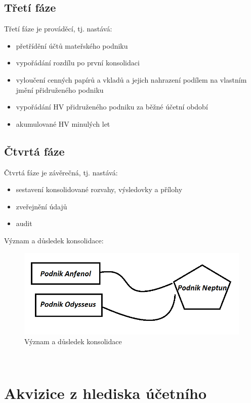 \documentclass[12pt]{article}
\begin{document}
\subsection{Třetí fáze}
Třetí fáze je prováděcí, tj. nastává:

\begin{itemize}
\item přetřídění účtů mateřského podniku
\item vypořádání rozdílu po první konsolidaci
\item vyloučení cenných papírů a vkladů a jejich nahrazení podílem na vlastním jmění přidruženého podniku
\item vypořádání HV přidruženého podniku za běžné účetní období
\item akumulované HV minulých let
\end{itemize}


\subsection{Čtvrtá fáze}
Čtvrtá fáze je závěrečná, tj. nastává:

\begin{itemize}
\item sestavení konsolidované rozvahy, výsledovky a přílohy
\item zveřejnění údajů
\item audit
\end{itemize}


Význam a důsledek konsolidace:
\\
\begin{figure}[h]
\begin{center}
	\caption{Význam a důsledek konsolidace}
		\label{figure:vyznam-dusledek}
		\includegraphics[scale=0.8]{pics/1-vyznam-dusledek.png}
	\end{center}
\end{figure}
\\
\section{Akvizice z hlediska účetního}
\end{document}
